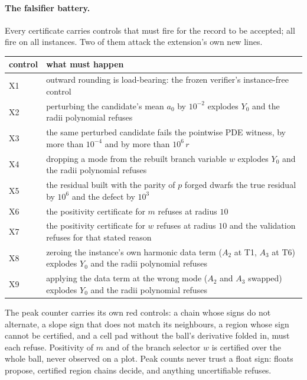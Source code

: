 \documentclass[11pt]{article}
\begin{document}
\paragraph{The falsifier battery.}
Every certificate carries \NumFalsifiers{} controls that must fire for the
record to be accepted; all \NumFalsifiers{} fire on all \NumInstances{}
instances. Two of them attack the extension's own new lines.
\begin{center}\small
\begin{tabular}{@{}lp{}@{}}
\toprule
control & what must happen \\
\midrule
X1 & outward rounding is load-bearing: the frozen verifier's instance-free control \\
X2 & perturbing the candidate's mean $a_0$ by $10^{-2}$ explodes $Y_0$ and the radii polynomial refuses \\
X3 & the same perturbed candidate fails the pointwise PDE witness, by more than $10^{-4}$ and by more than $10^6\,r$ \\
X4 & dropping a mode from the rebuilt branch variable $w$ explodes $Y_0$ and the radii polynomial refuses \\
X5 & the residual built with the parity of $p$ forged dwarfs the true residual by $10^6$ and the defect by $10^3$ \\
X6 & the positivity certificate for $m$ refuses at radius $10$ \\
X7 & the positivity certificate for $w$ refuses at radius $10$ and the validation refuses for that stated reason \\
X8 & zeroing the instance's own harmonic data term ($A_2$ at T1, $A_3$ at T6) explodes $Y_0$ and the radii polynomial refuses \\
X9 & applying the data term at the wrong mode ($A_2$ and $A_3$ swapped) explodes $Y_0$ and the radii polynomial refuses \\
\bottomrule
\end{tabular}
\end{center}
The peak counter carries its own red controls: a chain whose signs do not
alternate, a slope sign that does not match its neighbours, a region whose
sign cannot be certified, and a cell pad without the ball's derivative folded
in, must each refuse. Positivity of $m$ and of the branch selector $w$ is
certified over the whole ball, never observed on a plot. Peak counts never
trust a float sign: floats propose, certified region chains decide, and
anything uncertifiable refuses.
\end{document}
